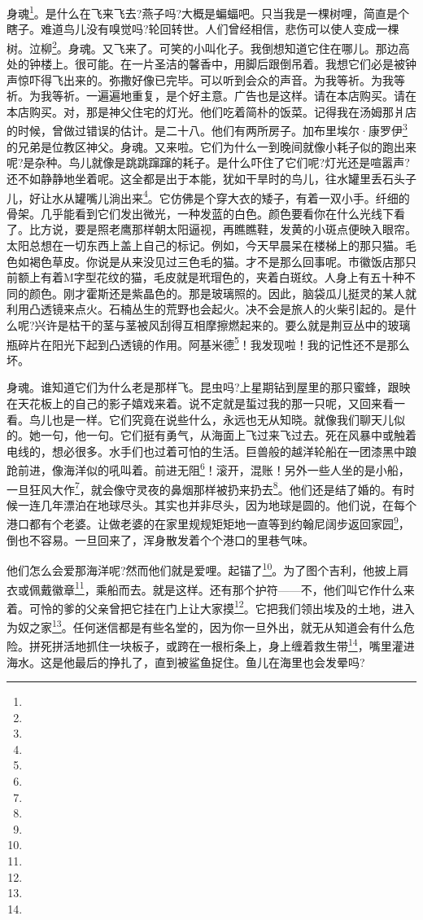 \par 身魂\footnote{}。是什么在飞来飞去?燕子吗?大概是蝙蝠吧。只当我是一棵树哩，简直是个瞎子。难道鸟儿没有嗅觉吗?轮回转世。人们曾经相信，悲伤可以使人变成一棵树。泣柳\footnote{}。身魂。又飞来了。可笑的小叫化子。我倒想知道它住在哪儿。那边高处的钟楼上。很可能。在一片圣洁的馨香中，用脚后跟倒吊着。我想它们必是被钟声惊吓得飞出来的。弥撒好像已完毕。可以听到会众的声音。为我等祈。为我等祈。为我等祈。一遍遍地重复，是个好主意。广告也是这样。请在本店购买。请在本店购买。对，那是神父住宅的灯光。他们吃着简朴的饭菜。记得我在汤姆那爿店的时候，曾做过错误的估计。是二十八。他们有两所房子。加布里埃尔·康罗伊\footnote{}的兄弟是位教区神父。身魂。又来啦。它们为什么一到晚间就像小耗子似的跑出来呢?是杂种。鸟儿就像是跳跳蹿蹿的耗子。是什么吓住了它们呢?灯光还是喧嚣声?还不如静静地坐着呢。这全都是出于本能，犹如干旱时的鸟儿，往水罐里丢石头子儿，好让水从罐嘴儿淌出来\footnote{}。它仿佛是个穿大衣的矮子，有着一双小手。纤细的骨架。几乎能看到它们发出微光，一种发蓝的白色。颜色要看你在什么光线下看了。比方说，要是照老鹰那样朝太阳逼视，再瞧瞧鞋，发黄的小斑点便映入眼帘。太阳总想在一切东西上盖上自己的标记。例如，今天早晨呆在楼梯上的那只猫。毛色如褐色草皮。你说是从来没见过三色毛的猫。才不是那么回事呢。市徽饭店那只前额上有着M字型花纹的猫，毛皮就是玳瑁色的，夹着白斑纹。人身上有五十种不同的颜色。刚才霍斯还是紫晶色的。那是玻璃照的。因此，脑袋瓜儿挺灵的某人就利用凸透镜来点火。石楠丛生的荒野也会起火。决不会是旅人的火柴引起的。是什么呢?兴许是枯干的茎与茎被风刮得互相摩擦燃起来的。要么就是荆豆丛中的玻璃瓶碎片在阳光下起到凸透镜的作用。阿基米德\footnote{}！我发现啦！我的记性还不是那么坏。
\par 身魂。谁知道它们为什么老是那样飞。昆虫吗?上星期钻到屋里的那只蜜蜂，跟映在天花板上的自己的影子嬉戏来着。说不定就是蜇过我的那一只呢，又回来看一看。鸟儿也是一样。它们究竟在说些什么，永远也无从知晓。就像我们聊天儿似的。她一句，他一句。它们挺有勇气，从海面上飞过来飞过去。死在风暴中或触着电线的，想必很多。水手们也过着可怕的生活。巨兽般的越洋轮船在一团漆黑中踉跄前进，像海洋似的吼叫着。前进无阻\footnote{}！滚开，混账！另外一些人坐的是小船，一旦狂风大作\footnote{}，就会像守灵夜的鼻烟那样被扔来扔去\footnote{}。他们还是结了婚的。有时候一连几年漂泊在地球尽头。其实也并非尽头，因为地球是圆的。他们说，在每个港口都有个老婆。让做老婆的在家里规规矩矩地一直等到约翰尼阔步返回家园\footnote{}，倒也不容易。一旦回来了，浑身散发着个个港口的里巷气味。
\par 他们怎么会爱那海洋呢?然而他们就是爱哩。起锚了\footnote{}。为了图个吉利，他披上肩衣或佩戴徽章\footnote{}，乘船而去。就是这样。还有那个护符——不，他们叫它作什么来着。可怜的爹的父亲曾把它挂在门上让大家摸\footnote{}。它把我们领出埃及的土地，进入为奴之家\footnote{}。任何迷信都是有些名堂的，因为你一旦外出，就无从知道会有什么危险。拼死拼活地抓住一块板子，或跨在一根桁条上，身上缠着救生带\footnote{}，嘴里灌进海水。这是他最后的挣扎了，直到被鲨鱼捉住。鱼儿在海里也会发晕吗?
